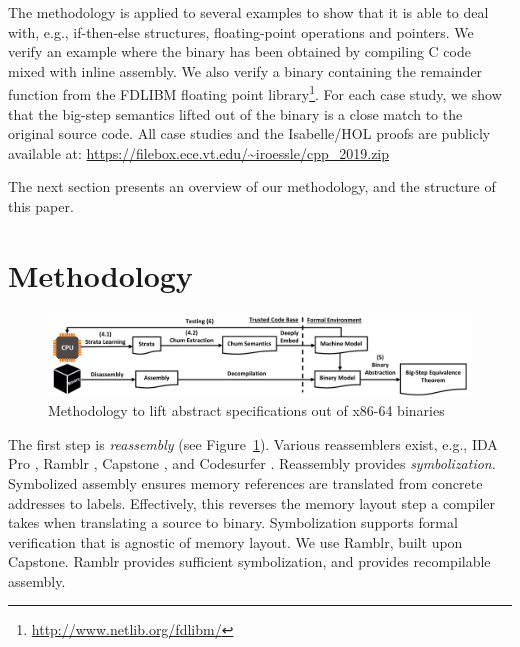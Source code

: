 The methodology is applied to several examples to show that it is able to deal with, e.g., if-then-else structures, floating-point operations and pointers.
We verify an example where the binary has been obtained by compiling C code mixed with inline assembly.
We also verify a binary containing the remainder function from the FDLIBM floating point library\footnote{\url{http://www.netlib.org/fdlibm/}}.
For each case study, we show that the big-step semantics lifted out of the binary is a close match to the original source code.
All case studies and the Isabelle/HOL proofs are publicly available at: \url{https://filebox.ece.vt.edu/~iroessle/cpp\_2019.zip}

The next section presents an overview of our methodology, and the structure of this paper.

\section{Methodology}

\begin{figure}
\includegraphics[width=\linewidth]{Overview_wide.pdf}
\caption{Methodology to lift abstract specifications out of x86-64 binaries}
\label{fig:method_overview}
\end{figure} 


The first step is \emph{reassembly} (see Figure~\ref{fig:method_overview}).
Various reassemblers exist, e.g., IDA Pro \cite{eagle2011ida}, Ramblr \cite{wang2017ramblr}, Capstone \cite{quynh2014capstone}, and Codesurfer \cite{balakrishnan2005codesurfer}.
Reassembly provides \emph{symbolization}.
Symbolized assembly ensures memory references are translated from concrete addresses to labels.
Effectively, this reverses the memory layout step a compiler takes when translating a source to binary.
Symbolization supports formal verification that is agnostic of memory layout.
We use Ramblr, built upon Capstone.
Ramblr provides sufficient symbolization, and provides recompilable assembly. %

